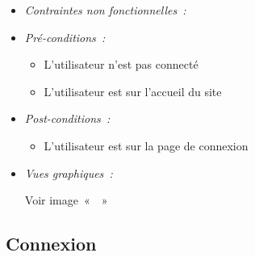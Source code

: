 \begin{itemize}
\item \textit{Contraintes non fonctionnelles~:}

\item \textit{Pré-conditions~:}

    \begin{itemize}
        \item L'utilisateur n'est pas connecté
        \item L'utilisateur est sur l'accueil du site
    \end{itemize}

\item \textit{Post-conditions~:}

    \begin{itemize}
        \item L'utilisateur est sur la page de connexion
    \end{itemize}
    
\item \textit{Vues graphiques~:}

Voir image~«~~»

\end{itemize}

\subsection{Connexion}\label{subsec:connexion}

